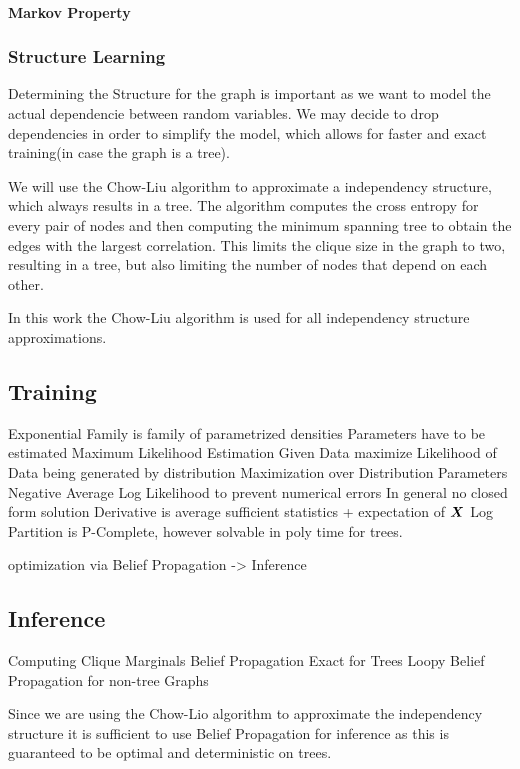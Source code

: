 \paragraph{Markov Property}

\subsubsection{Structure Learning}
    Determining the Structure for the graph is important as we want to model the actual dependencie
    between random variables. 
    We may decide to drop dependencies in order to simplify the model, which allows for faster and exact training(in case the graph is a tree).
    
    We will use the Chow-Liu algorithm to approximate a independency structure, which always results in a tree.
    The algorithm computes the cross entropy for every pair of nodes and then computing the minimum spanning tree to 
    obtain the edges with the largest correlation.
    This limits the clique size in the graph to two, resulting in a tree, but also limiting the number of nodes that depend on each other.

    In this work the Chow-Liu algorithm is used for all independency structure approximations.
\subsection{Training}
\label{ssec:train}

Exponential Family is family of parametrized densities
Parameters have to be estimated
Maximum Likelihood Estimation
Given Data maximize Likelihood of Data being generated by distribution
Maximization over Distribution Parameters 
Negative Average Log Likelihood to prevent numerical errors
In general no closed form solution
Derivative is average sufficient statistics + expectation of $\boldsymbol{X}$
Log Partition is P-Complete, however solvable in poly time for trees.

optimization via Belief Propagation -> Inference
\subsection{Inference}
\label{ssec:inf}

Computing Clique Marginals
Belief Propagation
Exact for Trees 
Loopy Belief Propagation for non-tree Graphs

Since we are using the Chow-Lio algorithm to approximate the independency structure it is sufficient to use Belief Propagation for inference as this is guaranteed to be optimal and deterministic on trees.

